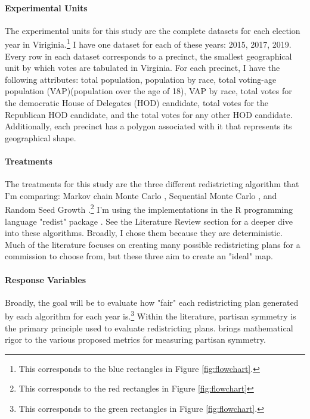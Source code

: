 \paragraph{Experimental Units}

The experimental units for this study are the complete datasets for each election year in Viriginia.\footnote{This corresponds to the blue rectangles in Figure \ref{fig:flowchart}.} I have one dataset for each of these years: 2015, 2017, 2019. Every row in each dataset corresponds to a precinct, the smallest geographical unit by which votes are tabulated in Virginia. For each precinct, I have the following attributes: total population, population by race, total voting-age population (VAP)(population over the age of 18), VAP by race, total votes for the democratic House of Delegates (HOD) candidate, total votes for the Republican HOD candidate, and the total votes for any other HOD candidate. Additionally, each precinct has a polygon associated with it that represents its geographical shape. 

\paragraph{Treatments}

The treatments for this study are the three different redistricting algorithm that I'm comparing: Markov chain Monte Carlo \parencite{fifield2020}, Sequential Monte Carlo \parencite{mccartan2020}, and Random Seed Growth \parencite{chen2013}.\footnote{This corresponds to the red rectangles in Figure \ref{fig:flowchart}} I'm using the implementations in the R programming language "redist" package \parencite{fifield2020d}. See the Literature Review section for a deeper dive into these algorithms. Broadly, I chose them because they are deterministic. Much of the literature focuses on creating many possible redistricting plans for a commission to choose from, but these three aim to create an "ideal" map. 

\paragraph{Response Variables}

Broadly, the goal will be to evaluate how "fair" each redistricting plan generated by each algorithm for each year is.\footnote{This corresponds to the green rectangles in Figure \ref{fig:flowchart}.} Within the literature, partisan symmetry is the primary principle used to evaluate redistricting plans. \textcite{katz2020} brings mathematical rigor to the various proposed metrics for measuring partisan symmetry. 

